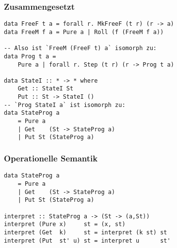 \documentclass[12pt,compress,ngerman,utf8,t]{beamer}
\begin{document}
\begin{frame}[fragile]\frametitle{Zusammengesetzt}
  \begin{verbatim}
data FreeF t a = forall r. MkFreeF (t r) (r -> a)
data FreeM f a = Pure a | Roll (f (FreeM f a))

-- Also ist `FreeM (FreeF t) a` isomorph zu:
data Prog t a =
    Pure a | forall r. Step (t r) (r -> Prog t a)

data StateI :: * -> * where
    Get :: StateI St
    Put :: St -> StateI ()
-- `Prog StateI a` ist isomorph zu:
data StateProg a
    = Pure a
    | Get    (St -> StateProg a)
    | Put St (StateProg a)
  \end{verbatim}
\end{frame}

\begin{frame}[fragile]\frametitle{Operationelle Semantik}
  \begin{verbatim}
data StateProg a
    = Pure a
    | Get    (St -> StateProg a)
    | Put St (StateProg a)

interpret :: StateProg a -> (St -> (a,St))
interpret (Pure x)     st = (x, st)
interpret (Get  k)     st = interpret (k st) st
interpret (Put  st' u) st = interpret u      st'
  \end{verbatim}
\end{frame}
\end{document}
